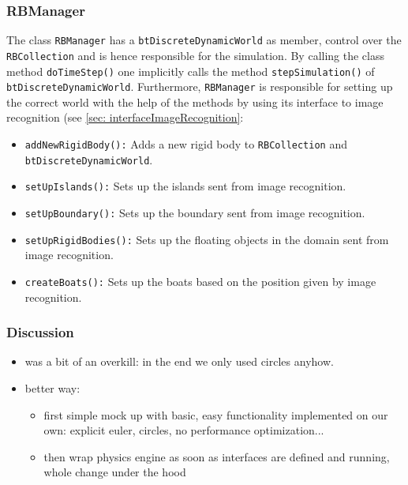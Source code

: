 \subsubsection*{RBManager}
\label{sec: rbManager}
The class \texttt{RBManager} has a \texttt{btDiscreteDynamicWorld} as member, control over the \texttt{RBCollection} and is hence responsible for the simulation. By calling the class method \texttt{doTimeStep()} one implicitly calls the method \texttt{stepSimulation()} of \texttt{btDiscreteDynamicWorld}. Furthermore, \texttt{RBManager} is responsible for setting up the correct world with the help of the methods by using its interface to image recognition (see \autoref{sec: interfaceImageRecognition}:
\begin{itemize}
\item \texttt{addNewRigidBody():} Adds a new rigid body to \texttt{RBCollection} and \texttt{btDiscreteDynamicWorld}.
\item \texttt{setUpIslands():} Sets up the islands sent from image recognition.
\item \texttt{setUpBoundary():} Sets up the boundary sent from image recognition.
\item \texttt{setUpRigidBodies():} Sets up the floating objects in the domain sent from image recognition.
\item \texttt{createBoats():} Sets up the boats based on the position given by image recognition.
\end{itemize}

\subsubsection{Discussion}
\begin{itemize}
\item was a bit of an overkill: in the end we only used circles anyhow.
\item better way: 
\begin{itemize}
\item first simple mock up with basic, easy functionality implemented on our own: explicit euler, circles, no performance optimization...
\item then wrap physics engine as soon as interfaces are defined and running, whole change under the hood
\end{itemize}
\end{itemize}

